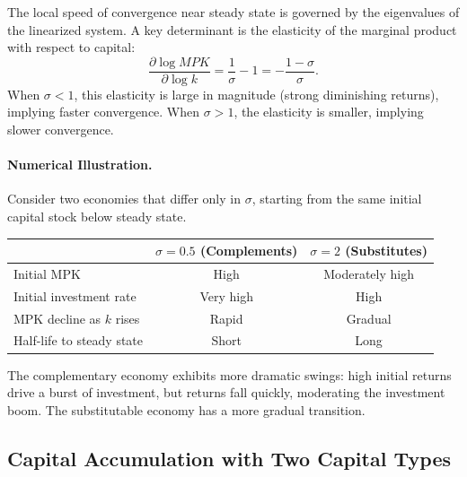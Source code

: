 \begin{calloutimportant}
The local speed of convergence near steady state is governed by the eigenvalues of the linearized system. A key determinant is the elasticity of the marginal product with respect to capital:
\begin{equation}
\frac{\partial \log MPK}{\partial \log k} = \frac{1}{\sigma} - 1 = -\frac{1-\sigma}{\sigma}.
\label{eq:mpk-elasticity}
\end{equation}
When $\sigma < 1$, this elasticity is large in magnitude (strong diminishing returns), implying faster convergence. When $\sigma > 1$, the elasticity is smaller, implying slower convergence.
\end{calloutimportant}

\paragraph{Numerical Illustration.}
Consider two economies that differ only in $\sigma$, starting from the same initial capital stock below steady state.

\begin{center}
\renewcommand{\arraystretch}{1.3}
\begin{tabular}{@{}lcc@{}}
\toprule
& $\sigma = 0.5$ (Complements) & $\sigma = 2$ (Substitutes) \\
\midrule
Initial MPK & High & Moderately high \\
Initial investment rate & Very high & High \\
MPK decline as $k$ rises & Rapid & Gradual \\
Half-life to steady state & Short & Long \\
\bottomrule
\end{tabular}
\end{center}

The complementary economy exhibits more dramatic swings: high initial returns drive a burst of investment, but returns fall quickly, moderating the investment boom. The substitutable economy has a more gradual transition.

\subsection{Capital Accumulation with Two Capital Types}
\label{subsec:two-capital-dynamics}

